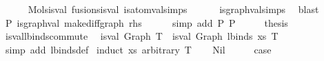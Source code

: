 \begin{isabellebody}
\ \ \ \ \isamarkupfalse%
\ Mols{}{\isacharunderscore}{\kern0pt}is{\isacharunderscore}{\kern0pt}val\ fusions{\isacharunderscore}{\kern0pt}is{\isacharunderscore}{\kern0pt}val\ is{\isacharunderscore}{\kern0pt}atom{\isacharunderscore}{\kern0pt}val{\isachardot}{\kern0pt}simps{\isacharparenleft}{\kern0pt}{}{\isacharparenright}{\kern0pt}\isanewline
\ \ \ \ \ \ is{\isacharunderscore}{\kern0pt}graph{\isacharunderscore}{\kern0pt}val{\isachardot}{\kern0pt}simps{\isacharparenleft}{\kern0pt}{}{\isacharparenright}{\kern0pt}\ \isamarkupfalse%
\ blast\isanewline
\ \ \isamarkupfalse%
\ P{}{\isacharcolon}{\kern0pt}\ {\isachardoublequoteopen}is{\isacharunderscore}{\kern0pt}graph{\isacharunderscore}{\kern0pt}val\ {\isacharparenleft}{\kern0pt}make{\isacharunderscore}{\kern0pt}diffgraph\ rhs{\isacharparenright}{\kern0pt}{\isachardoublequoteclose}\isanewline
\ \ \ \ \isamarkupfalse%
\ {\isacharparenleft}{\kern0pt}simp\ add{\isacharcolon}{\kern0pt}\ P{}\ P{}{\isacharparenright}{\kern0pt}\isanewline
\isanewline
\ \ \isamarkupfalse%
\ \isamarkupfalse%
\ {\isacharquery}{\kern0pt}thesis\ \isakeywordONE{{\isachardot}{\kern0pt}}\isamarkupfalse%
\isanewline
{}\isamarkupfalse%
%
\endisatagproof
{\isafoldproof}%
%
\isadelimproof
\isanewline
%
\endisadelimproof
\isanewline
\isanewline
{}\isamarkupfalse%
\ is{\isacharunderscore}{\kern0pt}val{\isacharunderscore}{\kern0pt}lbinds{\isacharunderscore}{\kern0pt}commute{\isacharcolon}{\kern0pt}\isanewline
\ \ {\isachardoublequoteopen}is{\isacharunderscore}{\kern0pt}val\ {\isacharparenleft}{\kern0pt}Graph\ T{\isacharparenright}{\kern0pt}\ {\isacharequal}{\kern0pt}\ is{\isacharunderscore}{\kern0pt}val\ {\isacharparenleft}{\kern0pt}Graph\ {\isacharparenleft}{\kern0pt}lbinds\ xs\ T{\isacharparenright}{\kern0pt}{\isacharparenright}{\kern0pt}{\isachardoublequoteclose}\isanewline
%
\isadelimproof
%
\endisadelimproof
%
\isatagproof
{}\isamarkupfalse%
\ {\isacharparenleft}{\kern0pt}simp\ add{\isacharcolon}{\kern0pt}\ lbinds{\isacharunderscore}{\kern0pt}def{\isacharparenright}{\kern0pt}\isanewline
{}\isamarkupfalse%
\ {\isacharparenleft}{\kern0pt}induct\ xs\ arbitrary{\isacharcolon}{\kern0pt}\ T{\isacharparenright}{\kern0pt}\isanewline
\ \ \isamarkupfalse%
\ Nil\isanewline
\ \ \isamarkupfalse%
\ \isamarkupfalse%
\ {\isacharquery}{\kern0pt}case\ \isanewline

\end{isabellebody}
